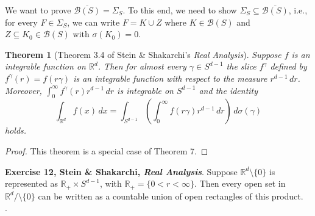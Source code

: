 \documentclass{article}
\theoremstyle{theorem}
\newtheorem{theorem}{Theorem}
\theoremstyle{remark}
\begin{document}
\newpage




\noindent We want to prove $\overline{\mathcal{B}(S)} = \Sigma_S$. To this end, we need to show $\Sigma_S \subseteq \overline{\mathcal{B}(S)}$, i.e., for every $F\in \Sigma_S$, we  can write $F = K \cup Z$ where $K \in\mathcal{B}(S)$ and $Z\subseteq K_0 \in \mathcal{B}(S)$ with $\sigma(K_0) = 0$. \\


\begin{theorem}[Theorem 3.4 of Stein \& Shakarchi's \textit{Real Analysis}]

    Suppose $f$ is an integrable function on $\mathbb{R}^d$. Then for almost every $\gamma \in S^{d-1}$ the slice $f^\gamma$ defined by $f^\gamma(r) = f(r\gamma)$ is an integrable function with respect to the measure $r^{d-1}\,dr$. Moreover, $\int^{\infty}_0 f^\gamma(r)r^{d-1}\,dr$ is integrable on $S^{d-1}$ and the identity
    \begin{equation*}
        \int_{\mathbb{R}^d} f(x)\,dx = \int_{S^{d-1}} \left( \int^\infty_0 f(r\gamma) r^{d-1}\,dr \right)\,d\sigma(\gamma)
    \end{equation*}
    holds. 
\end{theorem}


\begin{proof}
    This theorem is a special case of Theorem 7. 
\end{proof}



\noindent \textbf{Exercise 12, Stein \& Shakarchi, \textit{Real Analysis}}. Suppose $\mathbb{R}^d \setminus \{0\}$ is represented as $\mathbb{R}_+ \times S^{d-1}$, with $\mathbb{R}_+ = \{ 0 < r < \infty \}$. Then every open set in $\mathbb{R}^d/\setminus \{ 0 \}$  can be written as a countable union of open rectangles of this product. \\

. 
\end{document}

